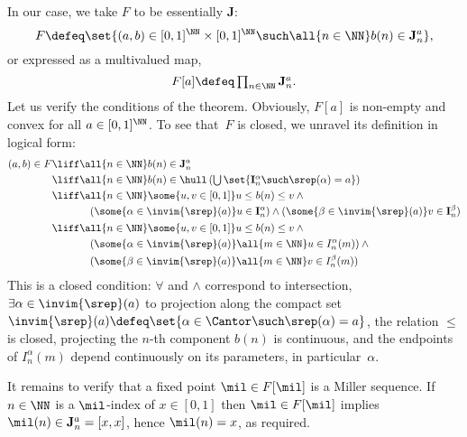 In our case, we take $F$ to be essentially $\mathbf{J}$:
%
\begin{equation*}
  F \defeq \set{(a, b) \in [0,1]^\NN \times [0,1]^\NN \such \all{n \in \NN} b(n) \in \mathbf{J}^a_n},
\end{equation*}
%
or expressed as a multivalued map,
%
\begin{equation*}
  \textstyle
  F[a] \defeq \prod_{n \in \NN} \mathbf{J}^a_n.
\end{equation*}
%
%
Let us verify the conditions of the theorem.
%
Obviously, $F[a]$ is non-empty and convex for all $a \in [0,1]^\NN$.
%
To see that~$F$ is closed, we unravel its definition in logical form:
%
\begin{align*}
  (a, b) \in F
  &\liff \all{n \in \NN} b(n) \in \mathbf{J}^a_n \\
  &\liff\textstyle
    \all{n \in \NN} b(n) \in
    \hull \left(
      \bigcup \set{ \mathbf{I}^\alpha_n \such \srep(\alpha) = a }
    \right) \\
  &\liff\textstyle
    \begin{aligned}[t]
      &\all{n \in \NN}
      \some{u, v \in [0,1]}
      u \leq b(n) \leq v \land {} \\
      &\quad
      (\some{\alpha \in \invim{\srep}(a)} u \in \mathbf{I}^\alpha_n)
      \land
      (\some{\beta \in \invim{\srep}(a)} v \in \smash{\mathbf{I}^\beta_n})
    \end{aligned}
  \\
  &\liff\textstyle
    \begin{aligned}[t]
      &\all{n \in \NN}
      \some{u, v \in [0,1]}
      u \leq b(n) \leq v \land {} \\
      &\quad
      (\some{\alpha \in \invim{\srep}(a)} \all{m \in \NN} u \in I^\alpha_n(m))
      \land {} \\
      &\quad
      (\some{\beta \in \invim{\srep}(a)} \all{m \in \NN} v \in I^\beta_n(m))
    \end{aligned}
\end{align*}
%
This is a closed condition: $\forall$ and $\land$ correspond to intersection, $\exists \alpha \in \invim{\srep}(a)$ to projection along the compact set $\invim{\srep}(a) \defeq \set{ \alpha \in \Cantor \such \srep(\alpha) = a}$, the relation $\leq$ is closed, projecting the $n$-th component $b(n)$ is continuous, and the endpoints of $I^\alpha_n(m)$ depend continuously on its parameters, in particular~$\alpha$.

It remains to verify that a fixed point $\mil \in F[\mil]$ is a Miller sequence. If $n \in \NN$ is a $\mil$-index of $x \in [0,1]$ then $\mil \in F[\mil]$ implies $\mil(n) \in \mathbf{J}^a_n = [x, x]$, hence $\mil(n) = x$, as required.

